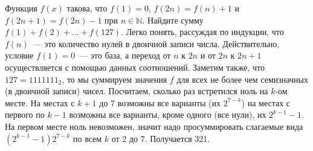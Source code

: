\problem
Функция $f(x)$ такова, что
$f(1) = 0$, $f(2 n) = f(n) + 1$ и $f(2 n + 1) = f(2 n) - 1$ при $n \in \mathbb{N}$.
Найдите сумму $f(1) + f(2) + \ldots + f(127)$.
\solution
Легко понять, рассуждая по индукции, что $f(n)$~--- это количество нулей в
двоичной записи числа.
Действительно, условие $f(1) = 0$~--- это база, а переход от $n$ к $2 n$ и
от $2 n$ к $2 n + 1$ осуществляется с помощью данных соотношений.
Заметим также, что $127 = 1111111_2$, то мы суммируем значения $f$ для всех
не более чем семизначных (в двоичной записи) чисел.
Посчитаем, сколько раз встретился ноль на $k$-ом месте.
На местах с $k + 1$ до 7 возможны все варианты (их $2^{7 - k}$) на местах с
первого по $k - 1$ возможны все варианты, кроме одного (все нули), их
$2^{k - 1} - 1$.
На первом месте ноль невозможен, значит надо просуммировать слагаемые вида
$(2^{k - 1} - 1) 2^{7 - k}$ по всем $k$ от 2 до 7.
Получается 321.
\endproblem
